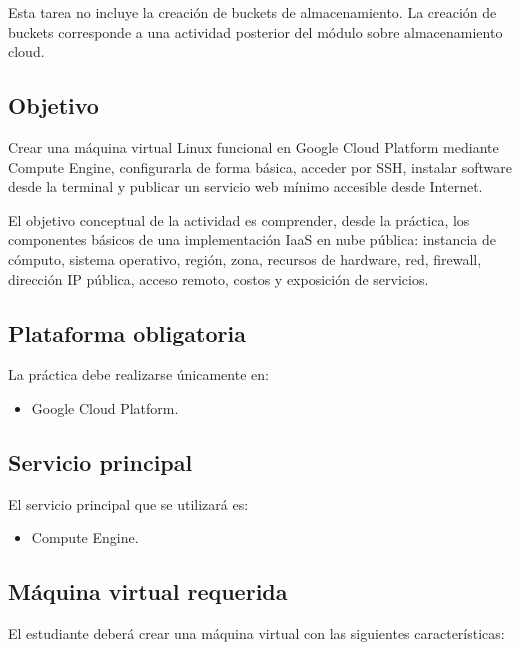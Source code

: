 \documentclass[
  coursetitle={Cómputo Nube y Tecnologías Emergentes},
  coursehours={96},
  coursedate={Verano 2026},
  doctype={Tarea 2},
  otherlangs={english,french},
  authorname={Lázaro},
  authorsurname={Bustio-Martínez},
  authortitle={PhD},
  role={Profesor Investigador},
  email={lbustio@inaoe.mx},
  phone={5559504000},
  ext={7459},
  institution={Instituto Nacional de Astrofísica, Óptica y Electrónica (INAOE)},
  department={Maestría en Ciencias en Tecnologías de Seguridad},
  address={Luis Enrique Erro 1, Sta. Ma. Tonantzintla, San Andrés Cholula, CP 72840, Puebla, México},
  margin={0.5in}
]{../../../lbustio_lecture_notes}
\begin{document}
Esta tarea no incluye la creación de buckets de almacenamiento. La creación de buckets corresponde a una actividad posterior del módulo sobre almacenamiento cloud.

\subsection{Objetivo}
\label{sec:tarea2-objetivo}

Crear una máquina virtual Linux funcional en Google Cloud Platform mediante Compute Engine, configurarla de forma básica, acceder por SSH, instalar software desde la terminal y publicar un servicio web mínimo accesible desde Internet.

El objetivo conceptual de la actividad es comprender, desde la práctica, los componentes básicos de una implementación IaaS en nube pública: instancia de cómputo, sistema operativo, región, zona, recursos de hardware, red, firewall, dirección IP pública, acceso remoto, costos y exposición de servicios.

\subsection{Plataforma obligatoria}
\label{sec:tarea2-plataforma}

La práctica debe realizarse únicamente en:

\begin{itemize}
  \item Google Cloud Platform.
\end{itemize}

\subsection{Servicio principal}
\label{sec:tarea2-servicio}

El servicio principal que se utilizará es:

\begin{itemize}
  \item Compute Engine.
\end{itemize}

\subsection{Máquina virtual requerida}
\label{sec:tarea2-vm-requerida}

El estudiante deberá crear una máquina virtual con las siguientes características:
\end{document}
